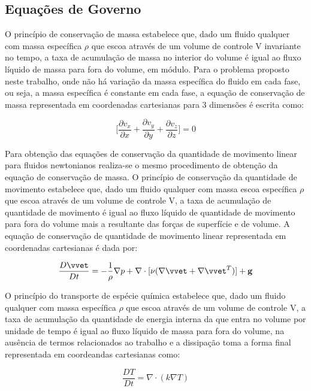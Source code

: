 \documentclass[a4paper,portuges]{article}
\begin{document}
\subsection{Equações de Governo}
O princípio de conservação de massa estabelece que, dado um fluido
qualquer com massa específica $\rho$ que escoa através de um volume de
controle V invariante no tempo, a taxa de acumulação de massa no
interior do volume é igual ao fluxo líquido de massa para fora do
volume, em módulo. Para o problema proposto neste trabalho, onde não há
variação da massa específica do fluido em cada fase, ou seja, a massa
específica é constante em cada fase, a equação de conservação de massa
representada em coordenadas cartesianas para 3 dimensões é escrita como:

\begin{equation}
	\bigg[ \frac{\partial v_x}{\partial x} +
	       \frac{\partial v_y}{\partial y} +
	       \frac{\partial v_z}{\partial z} \bigg] 
	= 
	0
	\label{eq:cm9}
\end{equation}

Para obtenção das equações de conservação da quantidade de movimento
linear para fluidos newtonianos realiza-se o mesmo procedimento de
obtenção da equação de conservação de massa. O princípio de conservação
da quantidade de movimento estabelece que, dado um fluido qualquer com
massa escoa específica $\rho$ que escoa através de um volume de controle
V, a taxa de acumulação de quantidade de movimento é igual ao fluxo
líquido de quantidade de movimento para fora do volume mais a resultante
das forças de superfície e de volume. A equação de conservação de
quantidade de movimento linear representada em coordenadas cartesianas é
dada por:

\begin{equation}
	\frac{D \vvet}{D t} = -\frac{1}{\rho}\nabla p +
	\nabla \cdot [\nu(\nabla \vvet + \nabla \vvet^T)]+\textbf{g}
\label{eq:NS3a}
\end{equation}

O princípio do transporte de espécie química estabelece que, dado um
fluido qualquer com massa específica $\rho$ que escoa através de um
volume de controle V, a taxa de acumulação da quantidade de energia
interna da que entra no volume por unidade de tempo é igual ao fluxo
líquido de massa para fora do volume, na ausência de termos relacionados
ao trabalho e a dissipação toma a forma final representada em
coordeandas cartesianas como:

\begin{equation}
	\frac{DT}{Dt} =  \nabla \cdot (k \nabla T)
\label{eq:quimica2}
\end{equation}\vspace{0.5cm}
\end{document}
